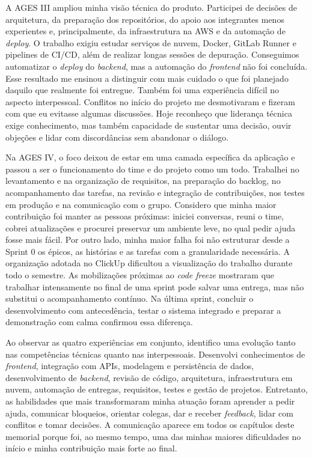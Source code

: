 A AGES III ampliou minha visão técnica do produto. Participei de decisões de
arquitetura, da preparação dos repositórios, do apoio aos integrantes menos
experientes e, principalmente, da infraestrutura na AWS e da automação de
\textit{deploy}. O trabalho exigiu estudar serviços de nuvem, Docker, GitLab
Runner e pipelines de CI/CD, além de realizar longas sessões de depuração.
Conseguimos automatizar o \textit{deploy} do \textit{backend}, mas a automação do
\textit{frontend} não foi concluída. Esse resultado me ensinou a distinguir
com mais cuidado o que foi planejado daquilo que realmente foi entregue. Também foi uma experiência difícil no aspecto interpessoal. Conflitos
no início do projeto me desmotivaram e fizeram com que eu evitasse algumas
discussões. Hoje reconheço que liderança técnica exige conhecimento, mas também
capacidade de sustentar uma decisão, ouvir objeções e lidar com discordâncias sem
abandonar o diálogo.

Na AGES IV, o foco deixou de estar em uma camada específica da aplicação e
passou a ser o funcionamento do time e do projeto como um todo. Trabalhei no
levantamento e na organização de requisitos, na preparação do backlog, no
acompanhamento das tarefas, na revisão e integração de contribuições, nos testes
em produção e na comunicação com o grupo. Considero que minha maior contribuição
foi manter as pessoas próximas: iniciei conversas, reuni o time, cobrei
atualizações e procurei preservar um ambiente leve, no qual pedir ajuda fosse
mais fácil. Por outro lado, minha maior falha foi não estruturar desde a Sprint 0
os épicos, as histórias e as tarefas com a granularidade necessária. A
organização adotada no ClickUp dificultou a visualização do trabalho durante
todo o semestre. As mobilizações próximas ao \textit{code freeze} mostraram que
trabalhar intensamente no final de uma sprint pode salvar uma entrega, mas não
substitui o acompanhamento contínuo. Na última sprint, concluir o desenvolvimento
com antecedência, testar o sistema integrado e preparar a demonstração com calma
confirmou essa diferença.

Ao observar as quatro experiências em conjunto, identifico uma evolução tanto
nas competências técnicas quanto nas interpessoais. Desenvolvi conhecimentos de
\textit{frontend}, integração com APIs, modelagem e persistência de dados,
desenvolvimento de \textit{backend}, revisão de código, arquitetura,
infraestrutura em nuvem, automação de entregas, requisitos, testes e gestão de
projetos. Entretanto, as habilidades que mais transformaram minha atuação foram
aprender a pedir ajuda, comunicar bloqueios, orientar colegas, dar e receber
\textit{feedback}, lidar com conflitos e tomar decisões. A comunicação aparece
em todos os capítulos deste memorial porque foi, ao mesmo tempo, uma das minhas
maiores dificuldades no início e minha contribuição mais forte ao final.

